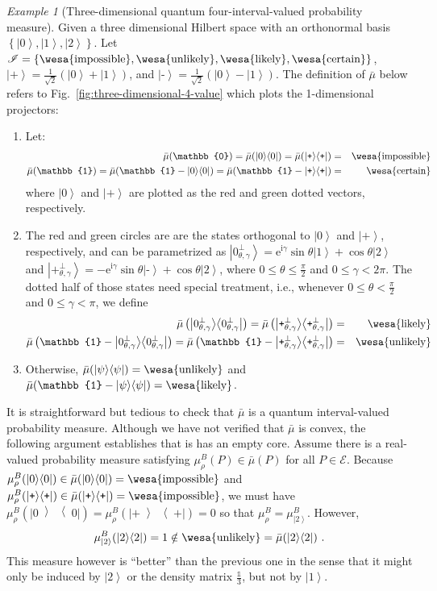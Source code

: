 \documentclass{article}
\theoremstyle{remark}
\newtheorem{example}{Example}
\newcommand{\events}{\ensuremath{\mathcal{E}}}
\newcommand{\imposs}{{\mbox{\wesa{impossible}}}}
\newcommand{\likely}{{\mbox{\wesa{likely}}}}
\newcommand{\unlikely}{{\mbox{\wesa{unlikely}}}}
\newcommand{\necess}{{\mbox{\wesa{certain}}}}
\newcommand{\ket}[1]{{\left\vert{#1}\right\rangle}}
\newcommand{\op}[2]{\ensuremath{\left\vert{#1}\middle\rangle\middle\langle{#2}\right\vert}}
\newcommand{\proj}[1]{\op{#1}{#1}}
\newcommand{\ps}{\texttt{+}}
\newcommand{\ms}{\texttt{-}}
\newcommand{\rme}{\mathrm{e}}
\newcommand{\rmi}{\mathrm{i}}
\begin{document}
\begin{example}[Three-dimensional quantum four-interval-valued 
  probability measure]\label{ex:three-dimensional-4-value}
  Given a three dimensional Hilbert space with an orthonormal basis
  $\left\{ \ket{0},\ket{1},\ket{2}\right\} $.  Let \emph{
  }$\mathscr{I}=\left\{ \imposs,\unlikely,\likely,\necess\right\} $,
  $\ket{\ps}=\frac{1}{\sqrt{2}}(\ket{0}+\ket{1})$, and
  $\ket{\ms}=\frac{1}{\sqrt{2}}(\ket{0}-\ket{1})$. The definition of
  $\bar{\mu}$ below refers to Fig.~\ref{fig:three-dimensional-4-value}
  which plots the 1-dimensional projectors:
\begin{enumerate}
\item Let:
\begin{eqnarray*}
\bar{\mu}(\mathbb{0})=\bar{\mu}(\proj{0})=\bar{\mu}(\proj{\ps}) 
  &=& \imposs \\
\bar{\mu}(\mathbb{1})=\bar{\mu}(\mathbb{1}-\proj{0})=\bar{\mu}(\mathbb{1}-\proj{\ps}) 
  &=& \necess
\end{eqnarray*}
where $\ket{0}$ and $\ket{\ps}$ are plotted as the red and green dotted
vectors, respectively.
\item The red and green circles are are the states orthogonal to
  $\ket{0}$ and $\ket{\ps}$, respectively, and can be parametrized as
  $\ket{0_{\theta,\gamma}^{\perp}}=\rme^{\rmi\gamma}\sin\theta\ket{1}+\cos\theta\ket{2}$
  and
  $\ket{\ps_{\theta,\gamma}^{\perp}}=-\rme^{\rmi\gamma}\sin\theta\ket{\ms}+\cos\theta\ket{2}$,
  where $0\le\theta\le\frac{\pi}{2}$ and $0\le\gamma<2\pi$. The dotted
  half of those states need special treatment, i.e., whenever
  $0\le\theta<\frac{\pi}{2}$ and $0\le\gamma<\pi$, we define
\begin{eqnarray*}
\bar{\mu}\left(\proj{0_{\theta,\gamma}^{\perp}}\right)=\bar{\mu}\left(\proj{\ps_{\theta,\gamma}^{\perp}}\right)
  &=& \likely \\
\bar{\mu}\left(\mathbb{1}-\proj{0_{\theta,\gamma}^{\perp}}\right)=
  \bar{\mu}\left(\mathbb{1}-\proj{\ps_{\theta,\gamma}^{\perp}}\right) 
  &=& \unlikely
\end{eqnarray*}
\item Otherwise, $\bar{\mu}(\proj{\psi})=\unlikely$ and $\bar{\mu}(\mathbb{1}-\proj{\psi})=\likely$. 
\end{enumerate}
It is straightforward but tedious to check that $\bar{\mu}$ is a
quantum interval-valued probability measure. Although we have not
verified that $\bar{\mu}$ is convex, the following argument
establishes that is has an empty core. Assume there is a real-valued
probability measure satisfying $\mu_{\rho}^{B}(P)\in\bar{\mu}(P)$ for
all $P\in\events$. Because
$\mu_{\rho}^{B}(\proj{0})\in\bar{\mu}(\proj{0})=\imposs$ and
$\mu_{\rho}^{B}(\proj{\ps})\in\bar{\mu}(\proj{\ps})=\imposs$, we must
have $\mu_{\rho}^{B}(\proj{0})=\mu_{\rho}^{B}(\proj{\ps})=0$ so that
$\mu_{\rho}^{B}=\mu_{\ket{2}}^{B}$. However,
\[
\mu_{\ket{2}}^{B}(\proj{2})=1\notin\unlikely=\bar{\mu}(\proj{2})\textrm{ .}
\]
This measure however is ``better'' than the previous one in the sense
that it might only be induced by $\ket{2}$ or the density matrix
$\frac{\mathbb{1}}{3}$, but not by
$\ket{1}$. 
\end{example}
\end{document}

